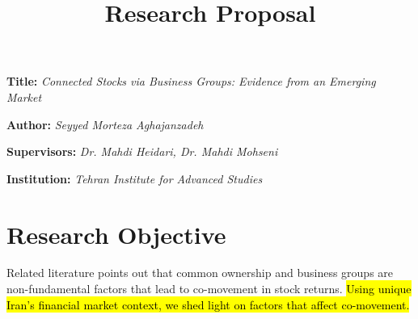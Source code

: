\documentclass[12pt, a4paper]{article}
\title{\textbf{Research Proposal}}
\author{}
\date{}
\newcommand{\namelistlabel}[1]{\mbox{#1}\hfil}
\newenvironment{namelist}[1]{%
	\begin{list}{}
		{
			\let\makelabel\namelistlabel
			\settowidth{\labelwidth}{#1}
			\setlength{\leftmargin}{1.1\labelwidth}
		}
	}{%
\end{list}}
\begin{document}
\maketitle
\begin{namelist}{xxxxxxxxxxxx}
	\item[{\bf Title:}]
	\textit{Connected Stocks via Business Groups: Evidence from an Emerging Market }
	\item[{\bf Author:}]
	\textit{ Seyyed Morteza Aghajanzadeh}
	\item[{\bf Supervisors:}]
	\textit{	Dr. Mahdi Heidari, Dr. Mahdi Mohseni}
	\item[{\bf Institution:}]
	\textit{	Tehran Institute for Advanced Studies}
\end{namelist}


\section*{Research Objective}
Related literature points out that common ownership and business groups are non-fundamental factors that lead to co-movement in stock returns. \hl{Using unique Iran's financial market context, we shed light on factors that affect co-movement.}
\end{document}
